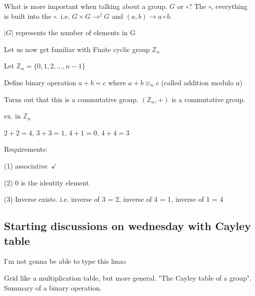 \documentclass[class=scrartcl, crop=false]{standalone}
\begin{document}
What is more important when talking about a group. $G$ or $\circ$? The $\circ$, everything is built into the $\circ$. i.e. $G \times G \to^{f} G$ and  $(a, b) \to a \circ b$.

$|G|$ represents the number of elements in G

Let us now get familiar with Finite cyclic group $\mathbb{Z}_n$

Let  $\mathbb{Z}_n = \{0, 1, 2, \dots, n - 1\}$

Define binary operation  $a + b = c$ where $a + b \equiv_n c$ (called addition modulo n)

Turns out that this is a commutative group.  $(\mathbb{Z}_n, +)$ is a commutative group.

ex. in $\mathbb{Z}_n$ 

$2 + 2 = 4$, $3 + 3 = 1$, $4 + 1 = 0$, $4 + 4 = 3$

Requirements: 

(1) associative $\ \checkmark$

(2) 0 is the identity element

(3) Inverse exists. i.e. inverse of 3 = 2, inverse of 4 = 1, inverse of 1 = 4

\subsection*{Starting discussions on wednesday with Cayley table}

I'm not gonna be able to type this lmao

Grid like a multiplication table, but more general. "The Cayley table of a group". Summary of a binary operation.
\end{document}
